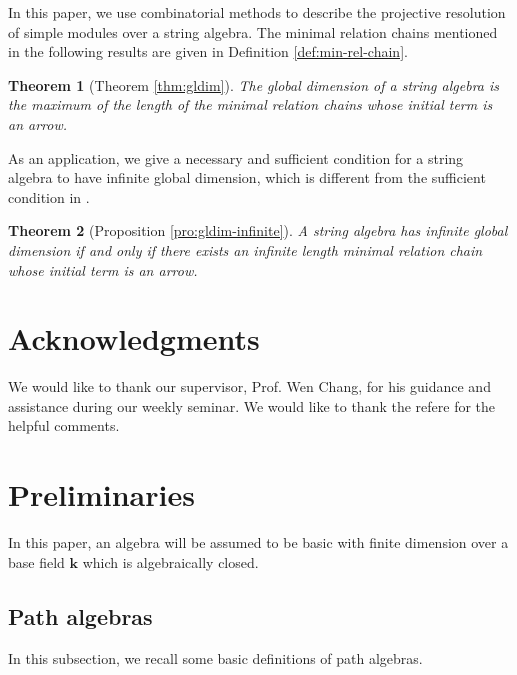\documentclass[11pt]{amsart}
\numberwithin{equation}{section}
\newtheorem{theoremA}{Theorem}
\theoremstyle{definition}
\begin{document}
In this paper, we use combinatorial methods to describe the projective resolution of simple modules over a string algebra. The minimal relation chains mentioned in the following results are given in Definition \ref{def:min-rel-chain}.

\begin{theoremA}[Theorem \ref{thm:gldim}]\label{Mtheorem:object}
	The global dimension of a string algebra is the maximum of the length of the minimal relation chains whose initial term is an arrow.
\end{theoremA}

As an application, we give a necessary and sufficient condition for a string algebra to have infinite global dimension, which is different from the sufficient condition in \cite{FGR21,FGR22}.
\begin{theoremA}[Proposition \ref{pro:gldim-infinite}]
	A string algebra has infinite global dimension if and only if there exists an infinite length minimal relation chain whose initial term is an arrow.
\end{theoremA}



\section*{Acknowledgments}
We would like to thank our supervisor, Prof. Wen Chang, for his guidance and assistance during our weekly seminar.  We would like to thank the refere for the helpful comments. 






\section{Preliminaries}\label{Preliminaries}

In this paper, an algebra will be assumed to be basic with finite dimension over a base field $\mathbf{k}$ which is algebraically closed. 

\subsection{Path algebras}\label{subsection: path algebras}
In this subsection, we recall some basic definitions of path algebras.
\end{document}
